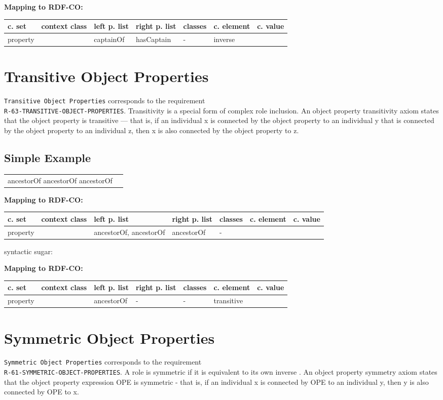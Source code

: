 \documentclass{llncs}
\newcommand{\ms}[1]{\texttt{#1}}
\newenvironment{gcotable}{
  \scriptsize
  \sffamily
  \vspace{0cm}
	\begin{center}
	\textbf{\vspace{0.4cm}Mapping to RDF-CO:} \\
  \begin{tabular}{l|l|l|l|l|l|l}
	\hline
  \textbf{c. set} & \textbf{context class} & \textbf{left p. list} & \textbf{right p. list} & \textbf{classes} & \textbf{c. element} & \textbf{c. value} \\
  \hline

}{
  \hline
  \end{tabular}
	\end{center}
}
\newenvironment{DL}{
\vspace{0cm}
	\begin{center}
  \begin{tabular}{r l}

}{
  \end{tabular}
	\end{center}
}
\begin{document}
\begin{gcotable}
property &  & captainOf & hasCaptain & - & inverse \\
\end{gcotable}


\section{Transitive Object Properties}

\ms{Transitive Object Properties} corresponds to the requirement \\
\ms{R-63-TRANSITIVE-OBJECT-PROPERTIES}.
Transitivity is a special form of complex role inclusion.
An object property transitivity axiom states that the object property is transitive — that is, if an individual x is connected by the object property to an individual y that is connected by the object property to an individual z, then x is also connected by the object property to z.

\subsection{Simple Example}

\begin{DL}
ancestorOf  ancestorOf  ancestorOf
\end{DL}

\begin{gcotable}
property &  & ancestorOf, ancestorOf & ancestorOf & - &  \\
\end{gcotable}

syntactic sugar:

\begin{gcotable}
property &  & ancestorOf & - & - & transitive \\
\end{gcotable}

\section{Symmetric Object Properties}

\ms{Symmetric Object Properties} corresponds to the requirement \\
\ms{R-61-SYMMETRIC-OBJECT-PROPERTIES}.
A role is symmetric if it is equivalent to its own inverse \cite{Kroetzsch2012}.
An object property symmetry axiom states that the object property expression OPE is symmetric - that is, if an individual x is connected by OPE to an individual y, then y is also connected by OPE to x. 	
\end{document}
